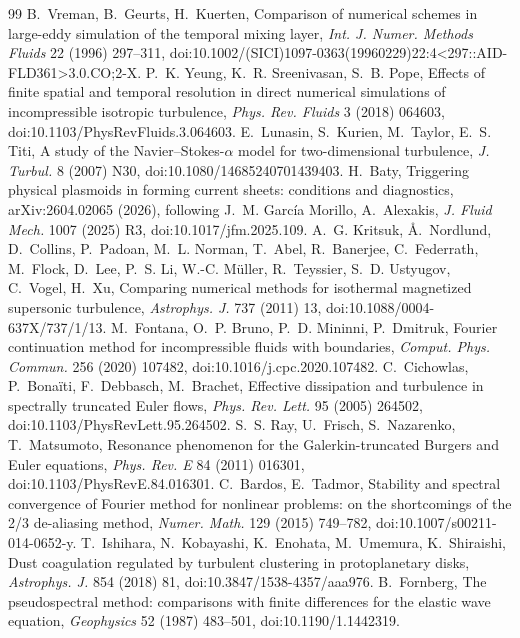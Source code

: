 \documentclass[11pt,a4paper]{article}
\begin{document}
\begin{thebibliography}{99}
B.~Vreman, B.~Geurts, H.~Kuerten, Comparison of numerical schemes in large-eddy simulation of the temporal mixing layer, \emph{Int. J. Numer. Methods Fluids} 22 (1996) 297--311, doi:10.1002/(SICI)1097-0363(19960229)22:4<297::AID-FLD361>3.0.CO;2-X.
P.~K. Yeung, K.~R. Sreenivasan, S.~B. Pope, Effects of finite spatial and temporal resolution in direct numerical simulations of incompressible isotropic turbulence, \emph{Phys. Rev. Fluids} 3 (2018) 064603, doi:10.1103/PhysRevFluids.3.064603.
E.~Lunasin, S.~Kurien, M.~Taylor, E.~S. Titi, A study of the Navier--Stokes-$\alpha$ model for two-dimensional turbulence, \emph{J. Turbul.} 8 (2007) N30, doi:10.1080/14685240701439403.
H.~Baty, Triggering physical plasmoids in forming current sheets: conditions and diagnostics, arXiv:2604.02065 (2026), following J.~M. Garc\'ia Morillo, A.~Alexakis, \emph{J. Fluid Mech.} 1007 (2025) R3, doi:10.1017/jfm.2025.109.
A.~G. Kritsuk, \AA.~Nordlund, D.~Collins, P.~Padoan, M.~L. Norman, T.~Abel, R.~Banerjee, C.~Federrath, M.~Flock, D.~Lee, P.~S. Li, W.-C. M\"uller, R.~Teyssier, S.~D. Ustyugov, C.~Vogel, H.~Xu, Comparing numerical methods for isothermal magnetized supersonic turbulence, \emph{Astrophys. J.} 737 (2011) 13, doi:10.1088/0004-637X/737/1/13.
M.~Fontana, O.~P. Bruno, P.~D. Mininni, P.~Dmitruk, Fourier continuation method for incompressible fluids with boundaries, \emph{Comput. Phys. Commun.} 256 (2020) 107482, doi:10.1016/j.cpc.2020.107482.
C.~Cichowlas, P.~Bona\"iti, F.~Debbasch, M.~Brachet, Effective dissipation and turbulence in spectrally truncated Euler flows, \emph{Phys. Rev. Lett.} 95 (2005) 264502, doi:10.1103/PhysRevLett.95.264502.
S.~S. Ray, U.~Frisch, S.~Nazarenko, T.~Matsumoto, Resonance phenomenon for the Galerkin-truncated Burgers and Euler equations, \emph{Phys. Rev. E} 84 (2011) 016301, doi:10.1103/PhysRevE.84.016301.
C.~Bardos, E.~Tadmor, Stability and spectral convergence of Fourier method for nonlinear problems: on the shortcomings of the 2/3 de-aliasing method, \emph{Numer. Math.} 129 (2015) 749--782, doi:10.1007/s00211-014-0652-y.
T.~Ishihara, N.~Kobayashi, K.~Enohata, M.~Umemura, K.~Shiraishi, Dust coagulation regulated by turbulent clustering in protoplanetary disks, \emph{Astrophys. J.} 854 (2018) 81, doi:10.3847/1538-4357/aaa976.
B.~Fornberg, The pseudospectral method: comparisons with finite differences for the elastic wave equation, \emph{Geophysics} 52 (1987) 483--501, doi:10.1190/1.1442319.

\end{thebibliography}
\end{document}
